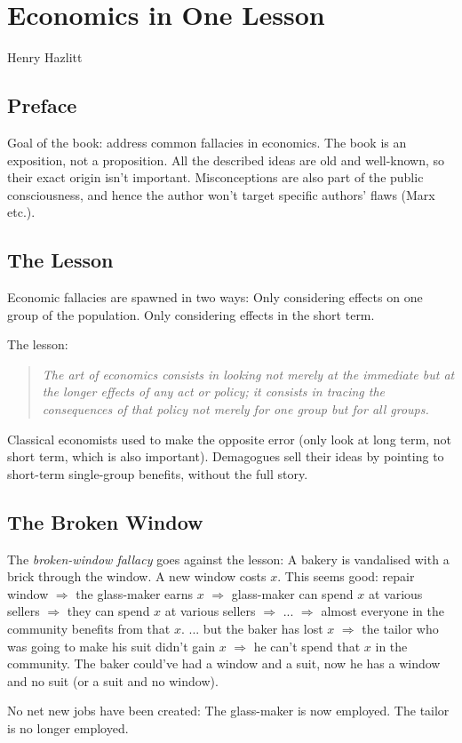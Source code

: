 \chapter{Economics in One Lesson}{Henry Hazlitt}
\section{Preface}
\begin{outline}
\1 Goal of the book: address common fallacies in economics.
\1 The book is an exposition, not a proposition.
	\2 All the described ideas are old and well-known, so their exact origin isn't important.
	\2 Misconceptions are also part of the public consciousness, and hence the author won't target specific authors' flaws (Marx etc.).
\end{outline}

\section{The Lesson}
\begin{outline}
\1 Economic fallacies are spawned in two ways:
	\2 Only considering effects on one group of the population.
	\2 Only considering effects in the short term.
	
\1 The lesson:
\begin{quote}
	\emph{The art of economics consists in looking not merely at the immediate but at the longer effects of any act or policy; it consists in tracing the consequences of that policy not merely for one group but for all groups.}
\end{quote}
	\2 Classical economists used to make the opposite error (only look at long term, not short term, which is also important).	
	\2 Demagogues sell their ideas by pointing to short-term single-group benefits, without the full story.
\end{outline}

\section{The Broken Window}
\begin{outline}
\1 The \emph{broken-window fallacy} goes against the lesson:
	\2 A bakery is vandalised with a brick through the window. A new window costs $x$.
	\2 This seems good: repair window $\Rightarrow$ the glass-maker earns $x$ $\Rightarrow$ glass-maker can spend $x$ at various sellers $\Rightarrow$ they can spend $x$ at various sellers $\Rightarrow$ ... $\Rightarrow$ almost everyone in the community benefits from that $x$.	
	\2 ... but the baker has lost $x$ $\Rightarrow$ the tailor who was going to make his suit didn't gain $x$ $\Rightarrow$ he can't spend that $x$ in the community. The baker could've had a window and a suit, now he has a window and no suit (or a suit and no window).

\1 No net new jobs have been created: 
	\2 The glass-maker is now employed.
	\2 The tailor is no longer employed.
\end{outline}

